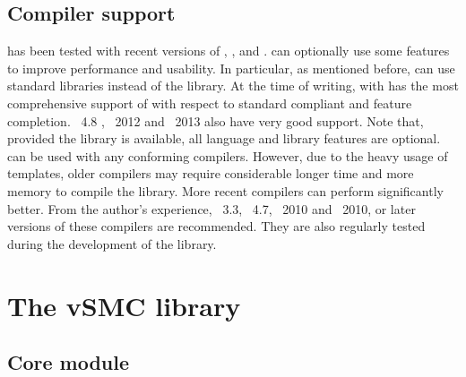 \documentclass[11pt, fontset=Minion, showoverfull,
bib, mintcode, minted=cache]{marticle}
\begin{document}
\subsection{Compiler support}

\vsmc has been tested with recent versions of \fclang, \fgcc, \ficpc and
\fmsvc. \vsmc can optionally use some \cppoo features to improve performance
and usability. In particular, as mentioned before, \vsmc can use \cppoo
standard libraries instead of the \lboost library. At the time of writing,
\lclang with \flibcpp has the most comprehensive support of \cppoo with respect
to standard compliant and feature completion. \lgcc~4.8 , \lmsvc~2012 and
\licpc~2013 also have very good \cppoo support. Note that, provided the \lboost
library is available, all \cppoo language and library features are optional.
\vsmc can be used with any \cppne conforming compilers. However, due to the
heavy usage of templates, older compilers may require considerable longer time
and more memory to compile the library. More recent compilers can perform
significantly better. From the author's experience, \lclang~3.3, \lgcc~4.7,
\licpc~2010 and \lmsvc~2010, or later versions of these compilers are
recommended. They are also regularly tested during the development of the
library.

\section{The vSMC library}
\label{sec:The vSMC library}

\subsection{Core module}
\label{sub:Core module}
\end{document}
